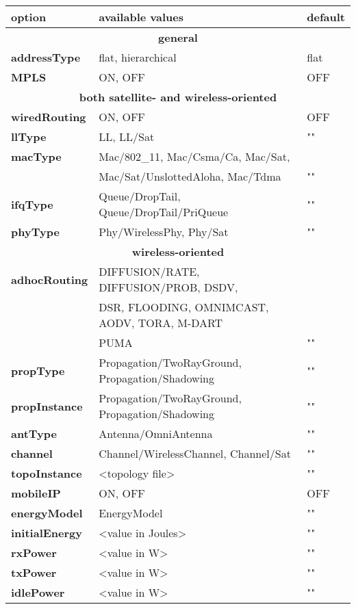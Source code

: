 \begin{table}[ht]
\label{table:nodeconfig}
\begin{center} 
{\footnotesize
\begin{tabular}{|l|l|l|}\hline
{\bf option} & {\bf available values} & {\bf default}\\\hline\hline 
\multicolumn{3}{|c|}{\bf general} \\\hline
{\bf addressType} & flat, hierarchical & flat\\\hline
{\bf MPLS} & ON, OFF & OFF\\\hline
\multicolumn{3}{|c|}{\bf both satellite- and wireless-oriented} \\\hline
{\bf wiredRouting} & ON, OFF & OFF\\\hline
{\bf llType} & LL, LL/Sat & "" \\\hline
{\bf macType} & Mac/802\_11, Mac/Csma/Ca, Mac/Sat, & \\ 
& Mac/Sat/UnslottedAloha, Mac/Tdma & "" \\\hline
{\bf ifqType} & Queue/DropTail, Queue/DropTail/PriQueue & "" \\\hline
{\bf phyType} & Phy/WirelessPhy, Phy/Sat& "" \\\hline
\multicolumn{3}{|c|}{\bf wireless-oriented} \\\hline
{\bf adhocRouting} & DIFFUSION/RATE, DIFFUSION/PROB, DSDV, & \\
& DSR, FLOODING, OMNIMCAST, AODV, TORA, M-DART & \\
& PUMA & ""\\\hline
{\bf propType} & Propagation/TwoRayGround, Propagation/Shadowing & ""\\\hline
{\bf propInstance} & Propagation/TwoRayGround, Propagation/Shadowing & ""\\\hline
{\bf antType} & Antenna/OmniAntenna & ""\\\hline
{\bf channel} & Channel/WirelessChannel, Channel/Sat & ""\\\hline
{\bf topoInstance} & <topology file> & ""\\\hline
{\bf mobileIP} & ON, OFF& OFF \\\hline
{\bf energyModel} & EnergyModel & "" \\\hline
{\bf initialEnergy} & <value in Joules> & "" \\\hline
{\bf rxPower} & <value in W> & "" \\\hline
{\bf txPower} & <value in W> & "" \\\hline
{\bf idlePower} & <value in W> & "" \\\hline

\end{tabular}}
\end{center}
\end{table}
